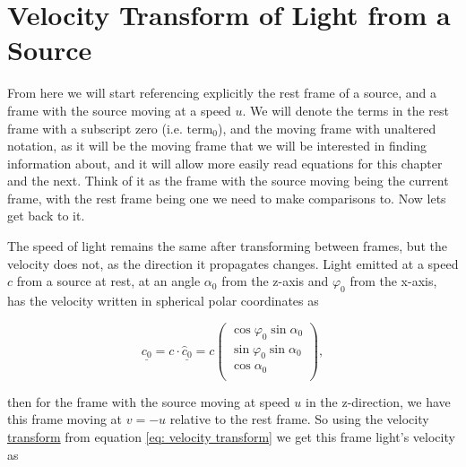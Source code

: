 \section{Velocity Transform of Light from a Source} \label{sect: Light Velocity Transform}

From here we will start referencing explicitly the rest frame of a source, and a frame with the source moving at a speed $u$.
We will denote the terms in the rest frame with a subscript zero (i.e. $\text{term}_0$), and the moving frame with unaltered notation, as it will be the moving frame that we will be interested in finding information about, and it will allow more easily read equations for this chapter and the next.
Think of it as the frame with the source moving being the current frame, with the rest frame being one we need to make comparisons to.
Now lets get back to it.

The speed of light remains the same after transforming between frames, but the velocity does not, as the direction it propagates changes.
Light emitted at a speed $c$ from a source at rest, at an angle $\alpha_0$ from the z-axis and $\varphi_0$ from the x-axis, has the velocity written in spherical polar coordinates as

\begin{equation}
	\underline{c_0}  = {c} \cdot {\underline{\hat{c}_0}}= {c}
	\begin{pmatrix}
		\cos{\varphi_0}\sin{\alpha_0} \\
		\sin{\varphi_0}\sin{\alpha_0} \\
		\cos{\alpha_0}                \\
	\end{pmatrix},
\end{equation}

then for the frame with the source moving at speed $u$ in the z-direction, we have this frame moving at $v=-u$ relative to the rest frame.
So using the velocity \hyperlink{def-transform}{transform} from equation \eqref{eq: velocity transform} we get this frame light's velocity as


